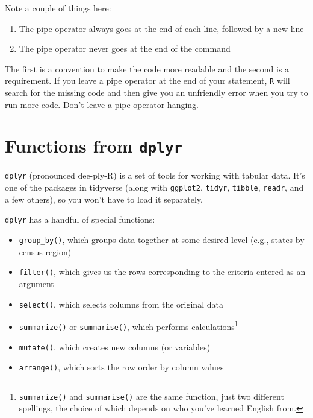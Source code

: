 \documentclass[
  letterpaper,
]{book}
\begin{document}
Note a couple of things here:

\begin{enumerate}
\def\labelenumi{\arabic{enumi}.}
\item
  The pipe operator always goes at the end of each line, followed by a
  new line
\item
  The pipe operator never goes at the end of the command
\end{enumerate}

The first is a convention to make the code more readable and the second
is a requirement. If you leave a pipe operator at the end of your
statement, \texttt{R} will search for the missing code and then give you
an unfriendly error when you try to run more code. Don't leave a pipe
operator hanging.

\hypertarget{functions-from-dplyr}{%
\section{\texorpdfstring{Functions from
\texttt{dplyr}}{Functions from dplyr}}\label{functions-from-dplyr}}

\texttt{dplyr} (pronounced dee-ply-R) is a set of tools for working with
tabular data. It's one of the packages in tidyverse (along with
\texttt{ggplot2}, \texttt{tidyr}, \texttt{tibble}, \texttt{readr}, and a
few others), so you won't have to load it separately.

\texttt{dplyr} has a handful of special functions:

\begin{itemize}
\item
  \texttt{group\_by()}, which groups data together at some desired level
  (e.g., states by census region)
\item
  \texttt{filter()}, which gives us the rows corresponding to the
  criteria entered as an argument
\item
  \texttt{select()}, which selects columns from the original data
\item
  \texttt{summarize()} or \texttt{summarise()}, which performs
  calculations\footnote{\texttt{summarize()} and \texttt{summarise()}
    are the same function, just two different spellings, the choice of
    which depends on who you've learned English from.}
\item
  \texttt{mutate()}, which creates new columns (or variables)
\item
  \texttt{arrange()}, which sorts the row order by column values
\end{itemize}
\end{document}
